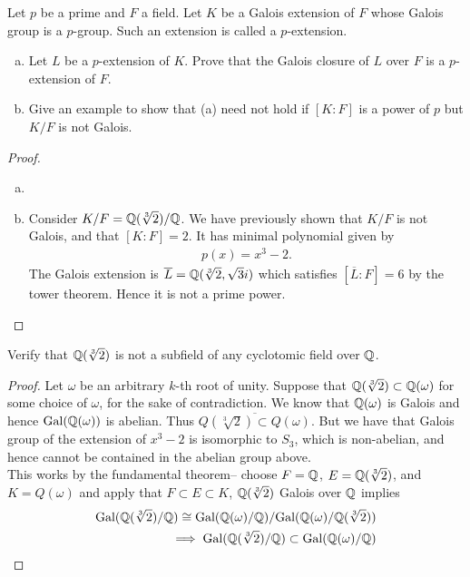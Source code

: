 \documentclass[num=12,duedate=04-28-21,course=Algebra\ II,proflastname=Walton]{hwtemplate}
\begin{document}
\problem[6] %
\begin{claim}
	Let \(p\) be a prime and \(F\) a field. Let \(K\) be a Galois extension of \(F\) whose Galois group is a \(p\)-group. Such an extension is called a \(p\)-extension.
	\begin{enumerate}[(a).]
		\item Let \(L\) be a \(p\)-extension of \(K\). Prove that the Galois closure of \(L\) over \(F\) is a \(p\)-extension of \(F\).
		\item Give an example to show that (a) need not hold if \([K:F]\) is a power of \(p\) but \(K / F\) is not Galois.
	\end{enumerate}
\end{claim}
\begin{proof}
	\begin{enumerate}[(a).]
		\item 
		\item Consider \(K / F = \mathbb{Q}(\sqrt[3]{2}) / \mathbb{Q} \). We have previously shown that \(K / F\) is not Galois, and that \([K : F] = 2\). It has minimal polynomial given by
			\begin{align*}
				p(x) = x^3-2.
			\end{align*}
			The Galois extension is \(\overline{L}= \mathbb{Q}(\sqrt[3]{2},\sqrt{3} i) \) which satisfies \([\overline{L}:F] = 6\) by the tower theorem. Hence it is not a prime power.
	\end{enumerate}
\end{proof}

\problem[7]
\begin{claim}
	Verify that \(\mathbb{Q}(\sqrt[3]{2} )\) is not a subfield of any cyclotomic field over \(\mathbb{Q}\).
\end{claim}
\begin{proof}
	Let \(\omega \) be an arbitrary \(k\)-th root of unity. Suppose that \(\mathbb{Q}(\sqrt[3]{2})\subset \mathbb{Q}(\omega ) \) for some choice of \(\omega \), for the sake of contradiction. We know that \(\mathbb{Q}(\omega )\) is Galois and hence \(\textrm{Gal}(\mathbb{Q}(\omega ))\) is abelian. Thus \(\overline{Q(\sqrt[3]{2}) \subset Q(\omega )}\). But we have that Galois group of the extension of \(x^3-2\) is isomorphic to \(S_3\), which is non-abelian, and hence cannot be contained in the abelian group above.\\

	This works by the fundamental theorem-- choose \(F = \mathbb{Q}\), \(E = \mathbb{Q}(\sqrt[3]{2} )\), and \(K = Q(\omega )\) and apply that \(F\subset E\subset K\), \(\mathbb{Q}(\sqrt[3]{2} )\) Galois over \(\mathbb{Q}\) implies
	\begin{align*}
		\textrm{Gal}(\mathbb{Q}(\sqrt[3]{2})  / \mathbb{Q}) \cong \textrm{Gal}(\mathbb{Q}(\omega ) / \mathbb{Q}) / \textrm{Gal}(\mathbb{Q}(\omega ) / \mathbb{Q}(\sqrt[3]{2} ))\\
		\implies \textrm{Gal}(\mathbb{Q}(\sqrt[3]{2})  / \mathbb{Q}) \subset \textrm{Gal}(\mathbb{Q}(\omega ) / \mathbb{Q})
	\end{align*}
\end{proof}
\end{document}
